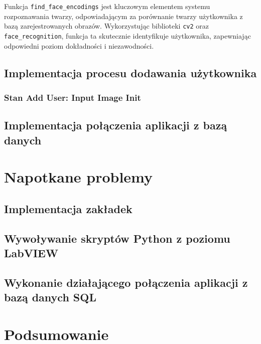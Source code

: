 \documentclass{report}
\begin{document}
Funkcja \texttt{find\_face\_encodings} jest kluczowym elementem systemu rozpoznawania twarzy, odpowiadającym za porównanie twarzy użytkownika z bazą zarejestrowanych obrazów. Wykorzystując biblioteki \texttt{cv2} oraz \texttt{face\_recognition}, funkcja ta skutecznie identyfikuje użytkownika, zapewniając odpowiedni poziom dokładności i niezawodności.

\subsection{\Large Implementacja procesu dodawania użytkownika}

\subsubsection{\large Stan Add User: Input Image Init}


\subsection{\Large Implementacja połączenia aplikacji z bazą danych}


\section{\LARGE Napotkane problemy}
\subsection{\Large Implementacja zakładek}

\subsection{\Large Wywoływanie skryptów Python z poziomu LabVIEW}

\subsection{\Large Wykonanie działającego połączenia aplikacji z bazą danych SQL}

\section{\LARGE Podsumowanie}
\end{document}
